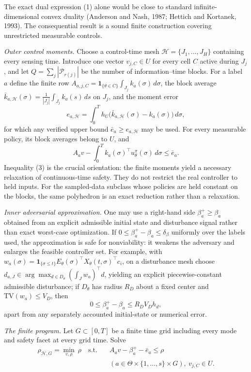 \documentclass[10pt,twocolumn]{article}
\theoremstyle{plain}
\theoremstyle{definition}
\theoremstyle{remark}
\begin{document}
The exact dual expression (1) alone would be close to standard
infinite-dimensional convex duality (Anderson and Nash, 1987; Hettich and
Kortanek, 1993). The consequential result is a sound finite construction
covering unrestricted measurable controls.

\emph{Outer control moments.} Choose a control-time mesh
\(\mathcal{H} = \{J_1,\dots,J_H\}\) containing every sensing time. Introduce
one vector \(v_{j,C} \in U\) for every cell \(C\) active during \(J_j\), and
let \(Q = \sum_j |\mathcal{P}_{r(j)}|\) be the number of information--time
blocks. For a label \(a\) define the finite row
\(A_{a,j,C} = \mathbf{1}_{\{\theta \in C\}} \int_{J_j} k_a(\sigma)\, d\sigma\),
the block average
\(\bar{k}_{a,\mathcal{H}}(\sigma) = \frac{1}{|J_j|} \int_{J_j} k_a(s)\, ds\)
on \(J_j\), and the moment error
\[
e_{a,\mathcal{H}} = \int_0^T h_U\!\bigl(\bar{k}_{a,\mathcal{H}}(\sigma)
- k_a(\sigma)\bigr)\, d\sigma,
\tag{2}
\]
for which any verified upper bound \(\bar{e}_a \ge e_{a,\mathcal{H}}\) may be
used. For every measurable policy, its block averages belong to \(U\), and
\[
A_a v - \int_0^T k_a(\sigma)^\top u^\pi_\theta(\sigma)\, d\sigma
\le \bar{e}_a.
\tag{3}
\]
Inequality (3) is the crucial orientation: the finite moments yield a
necessary relaxation of continuous-time safety. They do not restrict the real
controller to held inputs. For the sampled-data subclass whose policies are
held constant on the blocks, the same polyhedron is an exact reduction rather
than a relaxation.

\emph{Inner adversarial approximation.} One may use a right-hand side
\(\beta_a^{+} \ge \beta_a\) obtained from an explicit admissible initial
state and disturbance signal rather than exact worst-case optimization. If
\(0 \le \beta_a^{+} - \beta_a \le \delta_\beta\) uniformly over the labels
used, the approximation is safe for nonviability: it weakens the adversary
and enlarges the feasible controller set. For example, with
\(w_a(\sigma) = \mathbf{1}_{\{\sigma \le t\}}
E_\theta(\sigma)^\top X_\theta(t,\sigma)^\top c_i\), on a disturbance mesh
choose \(d_{a,J} \in \arg\max_{d \in D_\theta} (\int_J w_a)^\top d\),
yielding an explicit piecewise-constant admissible disturbance; if
\(D_\theta\) has radius \(R_D\) about a fixed center and
\(\mathrm{TV}(w_a) \le V_D\), then
\[
0 \le \beta_a^{+} - \beta_a \le R_D V_D h_d,
\tag{4}
\]
apart from any separately accounted initial-state or numerical error.

\emph{The finite program.} Let \(G \subset [0,T]\) be a finite time grid
including every mode and safety facet at every grid time. Solve
\begin{align*}
\rho_{\mathcal{H},G} = \min_{v, \rho}\ \rho
\quad \text{s.t.} \quad
& A_a v - \beta_a^{+} - \bar{e}_a \le \rho \\
& (a \in \Theta \times \{1,\dots,s\} \times G),
\ v_{j,C} \in U.
\tag{5}
\end{align*}
\end{document}
